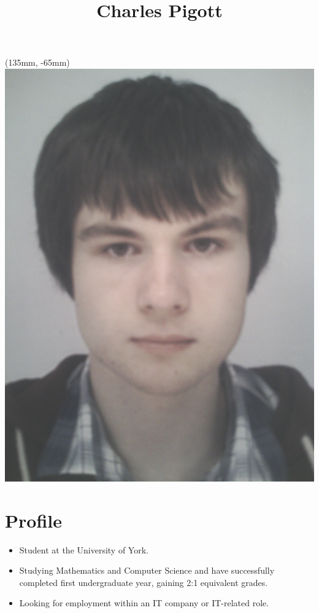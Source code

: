 \documentclass[11pt,a4paper]{article}
\title{\textbf{Charles Pigott}}
\author{}
\date{
  \email{\selfemail}\\
  07821 169 013 (Mobile)\\
  \address
}
\begin{document}
\color{black} %

\maketitle
\ifuni
  \begin{textblock*}{40mm}(135mm, -65mm)
  \includegraphics[scale=0.045]{FaceOct13}
  \end{textblock*}
\fi
\thispagestyle{fancy}

\section*{Profile}
\begin{itemize} \itemsep1pt \parskip0pt 
  \item Student at the University of York.
  \item Studying Mathematics and Computer Science and have successfully completed first undergraduate year, gaining 2:1 equivalent grades.
  \item Looking for employment within an IT company or IT-related role.
\end{itemize}
\end{document}
